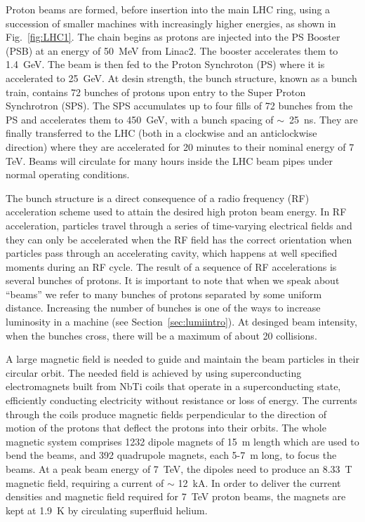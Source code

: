Proton beams are formed, before insertion into the main LHC ring, using a succession of smaller machines with increasingly  higher energies, as shown in Fig.~\ref{fig:LHC1}. The chain begins as protons are injected into the PS Booster (PSB) at an energy of 50~MeV from Linac2. The booster accelerates them to 1.4~GeV. The beam is then fed to the Proton Synchroton (PS) where it is accelerated to 25~GeV. At desin strength, the bunch structure, known as a bunch train, contains 72 bunches of protons upon entry to the Super Proton Synchrotron (SPS). The SPS accumulates up to four fills of 72 bunches from the PS and accelerates them to 450~GeV, with a bunch spacing of $\sim$~25~ns. They are finally transferred to the LHC (both in a clockwise and an anticlockwise direction) where they are accelerated for 20 minutes to their nominal energy of 7 TeV. Beams will circulate for many hours inside the LHC beam pipes under normal operating conditions.

The bunch structure is a direct consequence of a radio frequency (RF) acceleration scheme used to attain the desired high proton beam energy.  In RF acceleration, particles travel through a series of time-varying electrical fields and they can only be accelerated when the RF field has the correct orientation when particles pass through an accelerating cavity, which happens at well specified moments during an RF cycle. The result of a sequence of RF accelerations is several bunches of protons. It is important to note that when we speak about ``beams'' we refer to many bunches of protons separated by some uniform distance. Increasing the number of bunches is one of the ways to increase luminosity in a machine (see Section~\ref{sec:lumiintro}). At desinged beam intensity, when the bunches cross, there will be a maximum of about 20 collisions.

A large magnetic field is needed to guide and maintain the beam particles in their circular orbit. The needed field is achieved by using superconducting electromagnets built from NbTi coils that operate in a superconducting state, efficiently conducting electricity without resistance or loss of energy. The currents through the coils produce magnetic fields perpendicular to the direction of motion of the protons that deflect the protons into their orbits.  The whole magnetic system comprises 1232 dipole magnets of 15~m length which are used to bend the beams, and 392 quadrupole magnets, each 5-7~m long, to focus the beams. At a peak beam energy of 7~TeV, the dipoles need to produce an 8.33~T magnetic field, requiring a current of $\sim$ 12~kA. In order to deliver the current densities and magnetic field required for 7~TeV proton beams, the magnets are kept at 1.9~K by circulating superfluid helium.

